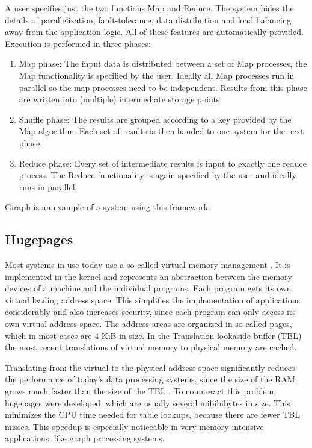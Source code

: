 A user specifies just the two functions Map and Reduce.
The system hides the details of parallelization, fault-tolerance, data distribution and load balancing away from the application logic.
All of these features are automatically provided.
Execution is performed in three phases:
\begin{enumerate}
	\item Map phase: The input data is distributed between a set of Map processes, the Map functionality is specified by the user. Ideally all Map processes run in parallel so the map processes need to be independent. Results from this phase are written into (multiple) intermediate storage points.
	\item Shuffle phase: The results are grouped according to a key provided by the Map algorithm. Each set of results is then handed to one system for the next phase.
	\item Reduce phase: Every set of intermediate results is input to exactly one reduce process. The Reduce functionality is again specified by the user and ideally runs in parallel.
\end{enumerate}
Giraph \cite{Giraph} is an example of a system using this framework.

\subsection{Hugepages}
Most systems in use today use a so-called virtual memory management \cite{virtual_memory}.
It is implemented in the kernel and represents an abstraction between the memory devices of a machine and the individual programs.
Each program gets its own virtual leading address space.
This simplifies the implementation of applications considerably and also increases security, since each program can only access its own virtual address space.
The address areas are organized in so called pages, which in most cases are 4 KiB in size.
In the Translation lookaside buffer (TBL) the most recent translations of virtual memory to physical memory are cached.

Translating from the virtual to the physical address space significantly reduces the performance of today's data processing systems, since the size of the RAM grows much faster than the size of the TBL \cite{hugepages, superpages}.
To counteract this problem, hugepages were developed, which are usually several mibibibytes in size.
This minimizes the CPU time needed for table lookups, because there are fewer TBL misses.
This speedup is especially noticeable in very memory intensive applications, like graph processing systems.

